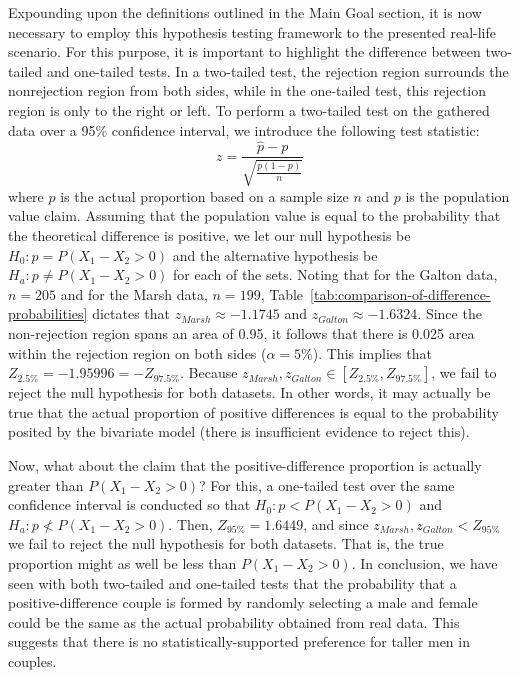 Expounding upon the definitions outlined in the Main Goal section, it is now necessary to employ this hypothesis testing framework to the presented real-life scenario.
For this purpose, it is important to highlight the difference between two-tailed and one-tailed tests.
In a two-tailed test, the rejection region surrounds the nonrejection region from both sides, while in the one-tailed test, this rejection region is only to the right or left.
To perform a two-tailed test on the gathered data over a 95\% confidence interval, we introduce the following test statistic:
\begin{equation}
    z=\frac{\hat{p}-p}{\sqrt{\frac{p(1-p)}{n}}}
    \label{eq:proportion-test-statistic}
\end{equation}
where $\hat{p}$ is the actual proportion based on a sample size $n$ and $p$ is the population value claim.
Assuming that the population value is equal to the probability that the theoretical difference is positive, we let our null hypothesis be $H_0:p=P(X_1-X_2>0)$ and the alternative hypothesis be $H_a:p\neq P(X_1-X_2>0)$ for each of the sets.
Noting that for the Galton data, $n=205$ and for the Marsh data, $n=199$, Table~\ref{tab:comparison-of-difference-probabilities} dictates that $z_{Marsh}\approx-1.1745$ and $z_{Galton}\approx-1.6324$.
Since the non-rejection region spans an area of 0.95, it follows that there is 0.025 area within the rejection region on both sides ($\alpha=5\%$).
This implies that $Z_{2.5\%}=-1.95996=-Z_{97.5\%}$.
Because $z_{Marsh},z_{Galton}\in[Z_{2.5\%}, Z_{97.5\%}]$, we fail to reject the null hypothesis for both datasets.
In other words, it may actually be true that the actual proportion of positive differences is equal to the probability posited by the bivariate model (there is insufficient evidence to reject this).

Now, what about the claim that the positive-difference proportion is actually greater than $P(X_1-X_2>0)$?
For this, a one-tailed test over the same confidence interval is conducted so that $H_0:p<P(X_1-X_2>0)$ and $H_a:p\nless P(X_1-X_2>0)$.
Then, $Z_{95\%}=1.6449$, and since $z_{Marsh},z_{Galton}<Z_{95\%}$ we fail to reject the null hypothesis for both datasets.
That is, the true proportion might as well be less than $P(X_1-X_2>0)$.
In conclusion, we have seen with both two-tailed and one-tailed tests that the probability that a positive-difference couple is formed by randomly selecting a male and female could be the same as the actual probability obtained from real data.
This suggests that there is no statistically-supported preference for taller men in couples.


